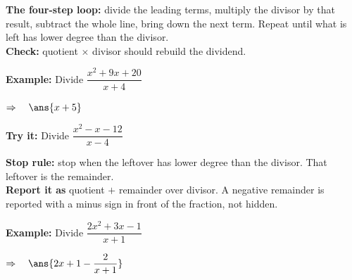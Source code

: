 \documentclass[12pt]{article}
\begin{document}


\begin{formulabox}
\textbf{The four-step loop:} divide the leading terms, multiply the divisor by
that result, subtract the whole line, bring down the next term. Repeat until
what is left has lower degree than the divisor.\\[3pt]
\textbf{Check:} quotient $\times$ divisor should rebuild the dividend.
\end{formulabox}

\begin{examplebox}
\textbf{Example:} \quad Divide $\dfrac{x^{2} + 9x + 20}{x + 4}$

$\Rightarrow\quad \ans{x + 5}$
\end{examplebox}

\begin{tryitbox}
\textbf{Try it:} \quad Divide $\dfrac{x^{2} - x - 12}{x - 4}$\\[2pt]
\end{tryitbox}


\begin{formulabox}
\textbf{Stop rule:} stop when the leftover has lower degree than the divisor.
That leftover is the remainder.\\[3pt]
\textbf{Report it as} quotient $+$ remainder over divisor. A negative remainder
is reported with a minus sign in front of the fraction, not hidden.
\end{formulabox}

\begin{examplebox}
\textbf{Example:} \quad Divide $\dfrac{2x^{2} + 3x - 1}{x + 1}$

$\Rightarrow\quad \ans{2x + 1 - \dfrac{2}{x + 1}}$
\end{examplebox}
\end{document}
